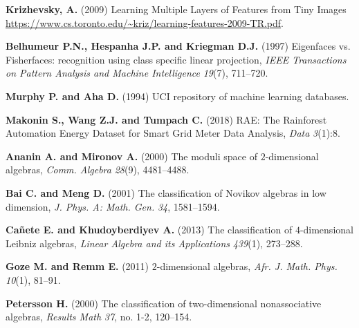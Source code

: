 \documentclass{CUP-JNL-DTM}%
\theoremstyle{definition}
\numberwithin{equation}{section}
\begin{document}
\begin{Backmatter}
\begin{thebibliography}{}
\textbf{Krizhevsky, A.} (2009) Learning Multiple Layers of Features from Tiny Images \url{https://www.cs.toronto.edu/~kriz/learning-features-2009-TR.pdf}.

\textbf{Belhumeur P.N., Hespanha J.P. and Kriegman D.J.} (1997) Eigenfaces vs. Fisherfaces: recognition using class specific linear projection, \textit{IEEE Transactions on Pattern Analysis and Machine Intelligence} \textit{19}(7), {711}--{720}.

\textbf{Murphy P. and Aha D.} (1994) UCI repository of machine learning databases.

\textbf{Makonin S., Wang Z.J. and Tumpach C.} (2018) RAE: The Rainforest Automation Energy Dataset for Smart Grid Meter Data Analysis, \textit{Data} \textit{3}(1):8. 



\textbf{Ananin A. and Mironov A.} (2000) The moduli space of $2$-dimensional algebras, \textit{Comm. Algebra} \textit{28}(9),  {4481}--{4488}.

\textbf{Bai C. and Meng D.} (2001) The classification of Novikov algebras in low dimension,  \textit{J. Phys. A: Math. Gen.} \textit{34}, {1581}--{1594}.

\textbf{Ca\~{n}ete E. and Khudoyberdiyev A.} (2013) The classification of $4$-dimensional Leibniz algebras,  \textit{Linear Algebra and its Applications}  \textit{439}(1), {273}--{288}.

\textbf{Goze M. and Remm E.} (2011)  $2$-dimensional algebras,  \textit{Afr. J. Math. Phys.} \textit{10}(1),  {81}--{91}.

\textbf{Petersson H.} (2000) The classification of two-dimensional nonassociative algebras,  \textit{Results Math} \textit{37}, no. 1-2,  {120}--{154}.


\end{thebibliography}

\end{Backmatter}
\end{document}
